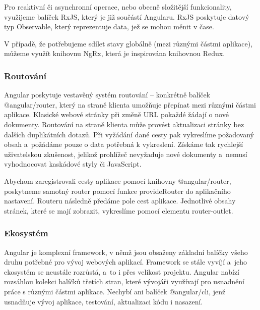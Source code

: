 Pro reaktivní či asynchronní operace, nebo obecně složitější funkcionality, využijeme balíček RxJS, který je již součástí Angularu. 
RxJS poskytuje datový typ Observable, který reprezentuje data, jež se mohou měnit v čase.\cite{angulario,rxjslibrary}

V případě, že potřebujeme sdílet stavy globálně (mezi různými částmi aplikace), můžeme využít knihovnu NgRx, která je inspirována knihovnou Redux.\cite{angularstatemanagement,ngrxlib}

\subsubsection{Routování}

Angular poskytuje vestavěný systém routování -- konkrétně balíček @angular/router, který na straně klienta umožňuje přepínat mezi různými částmi aplikace. 
Klasické webové stránky při změně URL pokaždé žádají o nové dokumenty. Routování na straně klienta může provést aktualizaci stránky bez dalších duplikátních dotazů. 
Při vyžádání dané cesty pak vykreslíme požadovaný obsah a~požádáme pouze o data potřebná k vykreslení. 
Získáme tak rychlejší uživatelskou zkušenost, jelikož prohlížeč nevyžaduje nové dokumenty a~nemusí vyhodnocovat kaskádové styly či JavaScript.

Abychom zaregistrovali cesty aplikace pomocí knihovny @angular/router, poskytneme samotný router pomocí funkce provideRouter do aplikačního nastavení. 
Routeru následně předáme pole cest aplikace. Jednotlivé obsahy stránek, které se mají zobrazit, vykreslíme pomocí elementu router-outlet.\cite{angulardev,learningangular}

\subsubsection{Ekosystém}

Angular je komplexní framework, v němž jsou obsaženy základní balíčky všeho druhu potřebné pro vývoj webových aplikací. 
Framework se stále vyvíjí a~jeho ekosystém se neustále rozrůstá, a~to i přes velikost projektu. 
Angular nabízí rozsáhlou kolekci balíčků třetích stran, které vývojáři využívají pro usnadnění práce s různými částmi aplikace. 
Nechybí ani balíček @angular/cli, jenž usnadňuje vývoj aplikace, testování, aktualizaci kódu i nasazení.\cite{angulardev,learningangular}